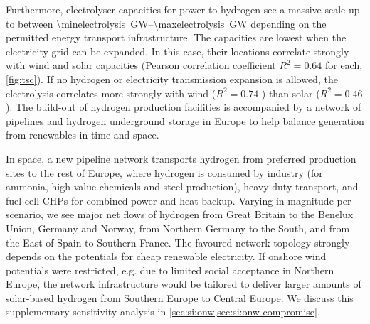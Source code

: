 Furthermore, electrolyser capacities for power-to-hydrogen see a massive
scale-up to between \SIrange{\minelectrolysis}{\maxelectrolysis}{\giga\watt}
depending on the permitted energy transport infrastructure. The capacities are
lowest when the electricity grid can be expanded. In this case, their locations
correlate strongly with wind and solar capacities (Pearson correlation
coefficient $R^2=0.64$ for each, \cref{fig:tsc}). If no hydrogen or electricity
transmission expansion is allowed, the electrolysis correlates more strongly
with wind ($R^2=0.74$ ) than solar ($R^2=0.46$). The build-out of hydrogen
production facilities is accompanied by a network of pipelines and hydrogen
underground storage in Europe to help balance generation from renewables in time
and space.

In space, a new pipeline network transports hydrogen from preferred production
sites to the rest of Europe, where hydrogen is consumed by industry (for
ammonia, high-value chemicals and steel production), heavy-duty transport, and
fuel cell CHPs for combined power and heat backup. Varying in magnitude per
scenario, we see major net flows of hydrogen from Great Britain to the Benelux
Union, Germany and Norway, from Northern Germany to the South, and from the East
of Spain to Southern France. The favoured network topology strongly
depends on the potentials for cheap renewable electricity. If onshore wind
potentials were restricted, e.g. due to limited social acceptance in Northern
Europe, the network infrastructure would be tailored to deliver larger amounts
of solar-based hydrogen from Southern Europe to Central Europe. We discuss this
supplementary sensitivity analysis in \cref{sec:si:onw,sec:si:onw-compromise}.


